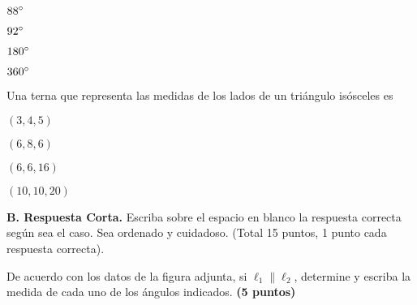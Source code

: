 \documentclass[12pt, fleqn]{article}
\begin{document}
\benu
\item[] \opc $88^\circ$\vf
\item[] \opc $92^\circ$ \vf
\item[] \opc $180^\circ$ \vf
\item[] \opc $360^\circ$
\eenu
\vs


\item Una terna que representa las medidas de los lados de un triángulo isósceles es \vp

\benu
\item[] \opc $(3,4,5)$\vf
\item[] \opc $(6,8,6)$ \vf
\item[] \opc $(6,6,16)$ \vf
\item[] \opc $(10,10,20)$
\eenu
\vs

\eenu


{\bf B. Respuesta Corta.} Escriba sobre el espacio en blanco la respuesta correcta según sea el caso. Sea ordenado y cuidadoso. (Total 15 puntos, 1 punto cada respuesta correcta).\vs

\benu
\item De acuerdo con los datos de la figura adjunta, si $\ell_1\parallel\ell_2$, determine y escriba la medida de cada uno de los ángulos indicados. \hfill{\bf (5 puntos)} \vs\vs\vs
\end{document}
